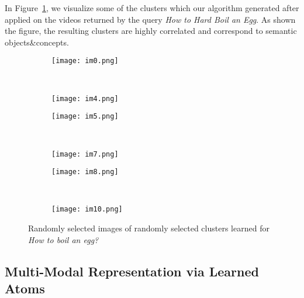 In Figure~\ref{cvis}, we visualize some of the clusters which our algorithm generated after applied on the videos returned by the query \emph{How to Hard Boil an Egg}. As shown the figure, the resulting clusters are highly correlated and correspond to semantic objects\&concepts.
\begin{figure}[ht]
  \begin{subfigure}[b]{0.23\textwidth}
\texttt{[image: im0.png]}
\end{subfigure}
~
\begin{subfigure}[b]{0.23\textwidth}
\texttt{[image: im4.png]}
\end{subfigure}
\begin{subfigure}[b]{0.23\textwidth}
\texttt{[image: im5.png]}
\end{subfigure}
~
\begin{subfigure}[b]{0.23\textwidth}
\texttt{[image: im7.png]}
\end{subfigure}

\begin{subfigure}[b]{0.23\textwidth}
\texttt{[image: im8.png]}
\end{subfigure}
~
\begin{subfigure}[b]{0.23\textwidth}
\texttt{[image: im10.png]}
\end{subfigure}
\caption{Randomly selected images of randomly selected clusters learned for \emph{How to boil an egg?}}
\label{cvis}
\end{figure}
\subsection{Multi-Modal Representation via Learned Atoms}
